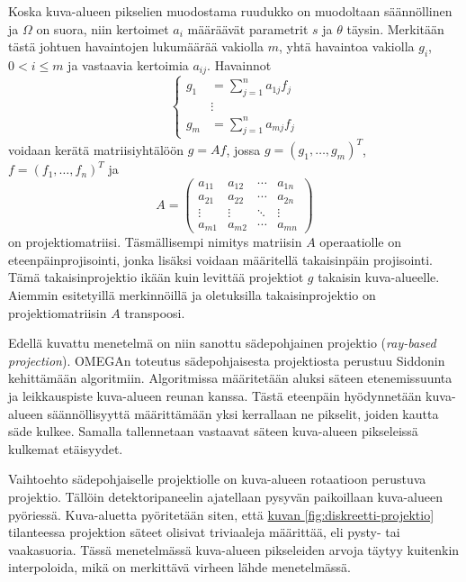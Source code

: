Koska kuva-alueen pikselien muodostama ruudukko on muodoltaan säännöllinen ja $\Omega$ on suora, niin kertoimet $a_i$ määräävät parametrit $s$ ja $\theta$ täysin. Merkitään tästä johtuen havaintojen lukumäärää vakiolla $m$, yhtä havaintoa vakiolla $g_i$, $0<i\leq m$ ja vastaavia kertoimia $a_{ij}$. Havainnot
\begin{equation*}
    \begin{cases}
        g_1&=\sum_{j=1}^{n}a_{1j}f_{j}\\
        &\vdots\\
        g_m&=\sum_{j=1}^{n}a_{mj}f_{j}
    \end{cases}
\end{equation*}
voidaan kerätä matriisiyhtälöön $g=Af$, jossa $g=\left( g_1, \ldots, g_m \right)^{T}$, $f=\left( f_1, \ldots, f_n \right)^{T}$ ja
\begin{equation*}
    A=
    \begin{pmatrix}
        a_{11} & a_{12} & \cdots & a_{1n} \\
        a_{21} & a_{22} & \cdots & a_{2n} \\
        \vdots & \vdots & \ddots & \vdots \\
        a_{m1} & a_{m2} & \cdots & a_{mn}
    \end{pmatrix}
\end{equation*}
on projektiomatriisi. Täsmällisempi nimitys matriisin $A$ operaatiolle on eteenpäinprojisointi, jonka lisäksi voidaan määritellä takaisinpäin projisointi. Tämä takaisinprojektio ikään kuin levittää projektiot $g$ takaisin kuva-alueelle. Aiemmin esitetyillä merkinnöillä ja oletuksilla takaisinprojektio on projektiomatriisin $A$ transpoosi.

Edellä kuvattu menetelmä on niin sanottu sädepohjainen projektio (\textit{ray-based projection}). OMEGAn toteutus sädepohjaisesta projektiosta perustuu Siddonin kehittämään algoritmiin\cite{wettenhovi_omegaopen-source_2021}. Algoritmissa määritetään aluksi säteen etenemissuunta ja leikkauspiste kuva-alueen reunan kanssa. Tästä eteenpäin hyödynnetään kuva-alueen säännöllisyyttä määrittämään yksi kerrallaan ne pikselit, joiden kautta säde kulkee. Samalla tallennetaan vastaavat säteen kuva-alueen pikseleissä kulkemat etäisyydet.\cite{siddon_fast_1985, sundermann_fast_1998}

Vaihtoehto sädepohjaiselle projektiolle on kuva-alueen rotaatioon perustuva projektio. Tällöin detektoripaneelin ajatellaan pysyvän paikoillaan kuva-alueen pyöriessä. Kuva-aluetta pyöritetään siten, että \hyperref[fig:diskreetti-projektio]{kuvan \ref*{fig:diskreetti-projektio}} tilanteessa projektion säteet olisivat triviaaleja määrittää, eli pysty- tai vaakasuoria. Tässä menetelmässä kuva-alueen pikseleiden arvoja täytyy kuitenkin interpoloida, mikä on merkittävä virheen lähde menetelmässä.\cite{di_bella_comparison_1996}

